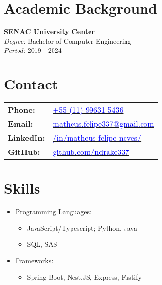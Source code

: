 \documentclass[a4paper,10pt]{article}
\begin{document}
\begin{minipage}[t]{0.60\textwidth}
    \section*{\faBook \space Academic Background}
        \textbf{SENAC University Center} \\
        \textit{Degree:} Bachelor of Computer Engineering \\
        \textit{Period:} 2019 - 2024
\end{minipage}%
\hfill
\begin{minipage}[t]{0.3\textwidth}
    \section*{\faAddressCard \space Contact}
    
    \begin{tabular}{l l}
        \textbf{Phone:} & \href{tel:+5511996315436}{\textcolor{blue}{+55 (11) 99631-5436}} \\
        \textbf{Email:} & \href{mailto:matheus.felipe337@gmail.com}{\textcolor{blue}{matheus.felipe337@gmail.com}} \\
        \textbf{LinkedIn:} & \href{https://www.linkedin.com/in/matheus-felipe-neves/}{\textcolor{blue}{/in/matheus-felipe-neves/}} \\
        \textbf{GitHub:} & \href{https://github.com/ndrake337}{\textcolor{blue}{github.com/ndrake337}}
    \end{tabular}

    \section*{\faTerminal \space Skills}

    \begin{itemize}[left=0pt, label={}]
        \item Programming Languages:
        \begin{itemize}
            \item JavaScript/Typescript; Python, Java
            \item SQL, SAS
        \end{itemize}
        
        \item Frameworks:
        \begin{itemize}
            \item Spring Boot, Nest.JS, Express, Fastify
        \end{itemize}
        

\end{itemize}
\end{minipage}
\end{document}

